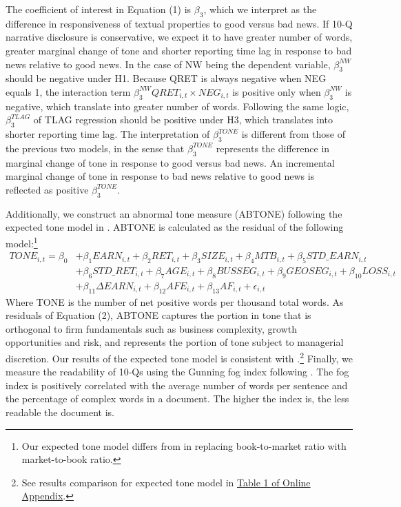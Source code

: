\documentclass[a4paper]{article}
\begin{document}
\begin{spacing}{2}
The coefficient of interest in Equation (1) is $\beta_3$, which we interpret as the difference in responsiveness of textual properties to good versus bad news. If 10-Q narrative disclosure is conservative, we expect it to have greater number of words, greater marginal change of tone and shorter reporting time lag in response to bad news relative to good news. In the case of NW being the dependent variable, $\beta_3^{NW}$ should be negative under H1. Because QRET is always negative when NEG equals 1, the interaction term $\beta_3^{NW}QRET_{i,t}\times NEG_{i,t}$ is positive only when $\beta_3^{NW}$ is negative, which translate into greater number of words. Following the same logic, $\beta_3^{TLAG}$ of TLAG regression should be positive under H3, which translates into shorter reporting time lag. The interpretation of $\beta_3^{TONE}$ is different from those of the previous two models, in the sense that $\beta_3^{TONE}$ represents the difference in marginal change of tone in response to good versus bad news. An incremental marginal change of tone in response to bad news relative to good news is reflected as positive $\beta_3^{TONE}$.

Additionally, we construct an abnormal tone measure (ABTONE) following the expected tone model in . ABTONE is calculated as the residual of the following model:\footnote{Our expected tone model differs from  in replacing book-to-market ratio with market-to-book ratio.}
\begin{equation} \label{eq2}
\begin{split}
TONE_{i,t}=\beta_0&+\beta_1EARN_{i,t}+\beta_2RET_{i,t}+\beta_3SIZE_{i,t}+\beta_4MTB_{i,t}+\beta_5STD\_EARN_{i,t}\\
&+\beta_6STD\_RET_{i,t}+\beta_7AGE_{i,t}+\beta_8BUSSEG_{i,t}+\beta_9GEOSEG_{i,t}+\beta_{10}LOSS_{i,t}\\
&+\beta_{11}\Delta EARN_{i,t}+\beta_{12}AFE_{i,t}+\beta_{13}AF_{i,t}+\epsilon_{i,t}
\end{split}
\end{equation}
Where TONE is the number of net positive words per thousand total words. As residuals of Equation (2), ABTONE captures the portion in tone that is orthogonal to firm fundamentals such as business complexity, growth opportunities and risk, and represents the portion of tone subject to managerial discretion. Our results of the expected tone model is consistent with .\footnote{See results comparison for expected tone model in \hyperref[oat1]{Table 1 of Online Appendix}.} Finally, we measure the readability of 10-Qs using the Gunning fog index following . The fog index is positively correlated with the average number of words per sentence and the percentage of complex words in a document. The higher the index is, the less readable the document is.


\end{spacing}
\end{document}
